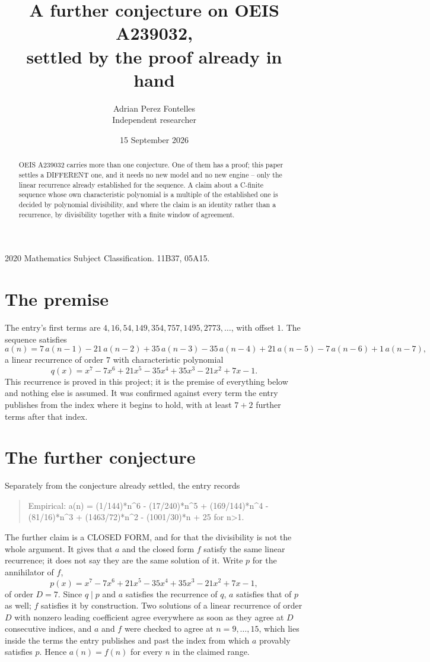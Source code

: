 \documentclass[11pt,a4paper]{article}
\title{A further conjecture on OEIS A239032,\\ \large settled by the proof already in hand}
\author{Adrian Perez Fontelles\\ \small Independent researcher}
\date{15 September 2026}
\theoremstyle{plain}
\theoremstyle{definition}
\begin{document}
\maketitle

\begin{abstract}
OEIS A239032 carries more than one conjecture. One of them has a proof; this paper settles a
DIFFERENT one, and it needs no new model and no new engine -- only the linear recurrence already
established for the sequence. A claim about a C-finite sequence whose own characteristic
polynomial is a multiple of the established one is decided by polynomial divisibility, and where
the claim is an identity rather than a recurrence, by divisibility together with a finite window
of agreement.
\end{abstract}

\noindent\small 2020 Mathematics Subject Classification. 11B37, 05A15.\normalsize

\section{The premise}

The entry's first terms are $4, 16, 54, 149, 354, 757, 1495, 2773,\dots$, with offset $1$. The sequence satisfies
\[
  a(n)=7\,a(n-1) - 21\,a(n-2) + 35\,a(n-3) - 35\,a(n-4) + 21\,a(n-5) - 7\,a(n-6) + 1\,a(n-7) ,
\]
a linear recurrence of order $7$ with characteristic polynomial
\[
  q(x)=x^{7} - 7 x^{6} + 21 x^{5} - 35 x^{4} + 35 x^{3} - 21 x^{2} + 7 x - 1 .
\]
This recurrence is proved in this project; it is the premise of everything below and nothing else is assumed.
It was confirmed against every term the entry publishes from the index where it begins to hold,
with at least $7+2$ further terms after that index.

\section{The further conjecture}

Separately from the conjecture already settled, the entry records

\begin{quote}\raggedright Empirical: a(n) = (1/144)*n\^{}6 - (17/240)*n\^{}5 + (169/144)*n\^{}4 - (81/16)*n\^{}3 + (1463/72)*n\^{}2 - (1001/30)*n + 25 for n>1.\end{quote}

The further claim is a CLOSED FORM, and for that the divisibility is not the whole argument. It
gives that $a$ and the closed form $f$ satisfy the same linear recurrence; it does not say they
are the same solution of it. Write $p$ for the annihilator of $f$,
\[
  p(x)=x^{7} - 7 x^{6} + 21 x^{5} - 35 x^{4} + 35 x^{3} - 21 x^{2} + 7 x - 1 ,
\]
of order $D=7$. Since $q\mid p$ and $a$ satisfies the recurrence of $q$, $a$ satisfies that of
$p$ as well; $f$ satisfies it by construction. Two solutions of a linear recurrence of order $D$
with nonzero leading coefficient agree everywhere as soon as they agree at $D$ consecutive
indices, and $a$ and $f$ were checked to agree at $n=9,\dots,15$,
which lies inside the terms the entry publishes and past the index from which $a$ provably
satisfies $p$. Hence $a(n)=f(n)$ for every $n$ in the claimed range.
\end{document}
